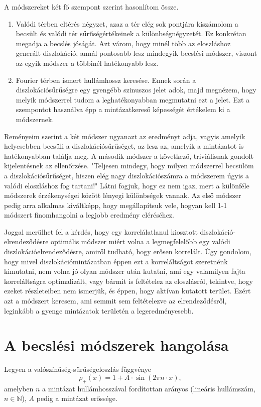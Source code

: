 \documentclass[10pt,a4paper]{scrartcl}
\begin{document}
A módszereket két fő szempont szerint hasonlítom össze.
\begin{enumerate}
    \item Valódi térben eltérés négyzet, azaz a tér elég sok pontjára kiszámolom a becsült és valódi tér sűrűségértékeinek a különbségnégyzetét. Ez konkrétan megadja a becslés jóságát. Azt várom, hogy minél több az eloszláshoz generált diszlokáció, annál pontosabb lesz mindegyik becslési módszer, viszont az egyik módszer a többinél hatékonyabb lesz.
    \item Fourier térben ismert hullámhossz keresése. Ennek során a diszlokációsűrűségre egy gyengébb szinuszos jelet adok, majd megnézem, hogy melyik módszerrel tudom a leghatékonyabban megmutatni ezt a jelet. Ezt a szempontot használva épp a mintázatkereső képességét értékelem ki a módszernek.
\end{enumerate}

Reményeim szerint a két módszer ugyanazt az eredményt adja, vagyis amelyik helyesebben becsüli a diszlokációsűrűséget, az lesz az, amelyik a mintázatot is hatékonyabban találja meg. A második módszer a következő, triviálisnak gondolt kijelentésnek az ellenőrzése. "Teljesen mindegy, hogy milyen módszerrel becsülöm a diszlokációsűrűséget, hiszen elég nagy diszlokációszámra a módszerem úgyis a valódi eloszláshoz fog tartani!" Látni fogjuk, hogy ez nem igaz, mert a különféle módszerek érzékenységei között lényegi különbségek vannak. Az első módszer pedig arra alkalmas kiváltképp, hogy megállapítsuk vele, hogyan kell 1-1 módszert finomhangolni a legjobb eredmény eléréséhez.

Joggal merülhet fel a kérdés, hogy egy korrelálatlanul kiosztott diszlokáció-elrendeződésre optimális módszer miért volna a legmegfelelőbb egy valódi diszlokációelrendeződésre, amiről tudható, hogy erősen korrelált. Úgy gondolom, hogy mivel diszlokációmintázatban éppen ezt a korreláltságot szeretnénk kimutatni, nem volna jó olyan módszer után kutatni, ami egy valamilyen fajta korreláltságra optimalizált, vagy bármit is feltételez az eloszlásról, tekintve, hogy ezeket részleteiben nem ismerjük, és éppen, hogy aktívan kutatott terület. Ezért azt a módszert keresem, ami semmit sem feltételezve az elrendeződésről, leginkább a gyenge mintázatok területén a legeredményesebb.

\section{A becslési módszerek hangolása}
Legyen a valószínűség-sűrűségeloszlás függvénye
\[{\rho _ + }\left( x \right) = 1 + A \cdot \sin \left( {2\pi n \cdot x} \right),\]
amelyben $n$ a mintázat hullámhosszával fordítottan arányos (lineáris hullámszám, $n \in \mathbb{N}$), $A$ pedig a mintázat erőssége.
\end{document}
